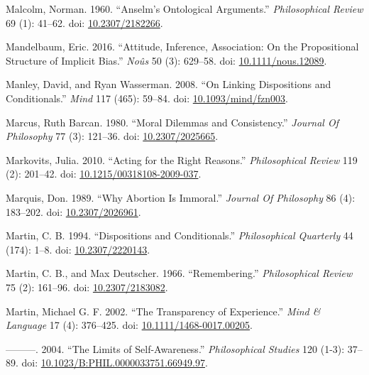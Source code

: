 \documentclass[
  10pt,
  letterpaper,
  DIV=11,
  numbers=noendperiod,
  twoside]{scrartcl}
\newlength{\cslhangindent}
\newenvironment{CSLReferences}[2] %
 {\begin{list}{}{%
  \setlength{\itemindent}{0pt}
  \setlength{\leftmargin}{0pt}
  \setlength{\parsep}{0pt}
  \ifodd #1
   \setlength{\leftmargin}{\cslhangindent}
   \setlength{\itemindent}{-1\cslhangindent}
  \fi
  \setlength{\itemsep}{#2\baselineskip}}}
 {\end{list}}
\begin{document}
\begin{CSLReferences}{1}{0}
Malcolm, Norman. 1960. {``Anselm's Ontological Arguments.''}
\emph{Philosophical Review} 69 (1): 41--62. doi:
\href{https://doi.org/10.2307/2182266}{10.2307/2182266}.

Mandelbaum, Eric. 2016. {``Attitude, Inference, Association: On the
Propositional Structure of Implicit Bias.''} \emph{Noûs} 50 (3):
629--58. doi:
\href{https://doi.org/10.1111/nous.12089}{10.1111/nous.12089}.

Manley, David, and Ryan Wasserman. 2008. {``On Linking Dispositions and
Conditionals.''} \emph{Mind} 117 (465): 59--84. doi:
\href{https://doi.org/10.1093/mind/fzn003}{10.1093/mind/fzn003}.

Marcus, Ruth Barcan. 1980. {``Moral Dilemmas and Consistency.''}
\emph{Journal Of Philosophy} 77 (3): 121--36. doi:
\href{https://doi.org/10.2307/2025665}{10.2307/2025665}.

Markovits, Julia. 2010. {``Acting for the Right Reasons.''}
\emph{Philosophical Review} 119 (2): 201--42. doi:
\href{https://doi.org/10.1215/00318108-2009-037}{10.1215/00318108-2009-037}.

Marquis, Don. 1989. {``Why Abortion Is Immoral.''} \emph{Journal Of
Philosophy} 86 (4): 183--202. doi:
\href{https://doi.org/10.2307/2026961}{10.2307/2026961}.

Martin, C. B. 1994. {``Dispositions and Conditionals.''}
\emph{Philosophical Quarterly} 44 (174): 1--8. doi:
\href{https://doi.org/10.2307/2220143}{10.2307/2220143}.

Martin, C. B., and Max Deutscher. 1966. {``Remembering.''}
\emph{Philosophical Review} 75 (2): 161--96. doi:
\href{https://doi.org/10.2307/2183082}{10.2307/2183082}.

Martin, Michael G. F. 2002. {``The Transparency of Experience.''}
\emph{Mind \& Language} 17 (4): 376--425. doi:
\href{https://doi.org/10.1111/1468-0017.00205}{10.1111/1468-0017.00205}.

---------. 2004. {``The Limits of Self-Awareness.''} \emph{Philosophical
Studies} 120 (1-3): 37--89. doi:
\href{https://doi.org/10.1023/B:PHIL.0000033751.66949.97}{10.1023/B:PHIL.0000033751.66949.97}.


\end{CSLReferences}
\end{document}
